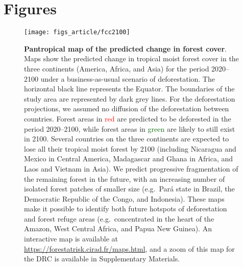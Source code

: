 \documentclass[
  12pt,
]{article}
\begin{document}
\nolinenumbers
\newpage


\hypertarget{figures}{%
\section*{Figures}\label{figures}}



\begin{figure}[H]

{\centering \texttt{[image: figs\_article/fcc2100]} 

}

\caption{\textbf{Pantropical map of the predicted change in forest cover}. Maps show the predicted change in tropical moist forest cover in the three continents (America, Africa, and Asia) for the period 2020--2100 under a business-as-usual scenario of deforestation. The horizontal black line represents the Equator. The boundaries of the study area are represented by dark grey lines. For the deforestation projections, we assumed no diffusion of the deforestation between countries. Forest areas in \textcolor{red}{red} are predicted to be deforested in the period 2020--2100, while forest areas in \textcolor{darkgreen}{green} are likely to still exist in 2100. Several countries on the three continents are expected to lose all their tropical moist forest by 2100 (including Nicaragua and Mexico in Central America, Madagascar and Ghana in Africa, and Laos and Vietnam in Asia). We predict progressive fragmentation of the remaining forest in the future, with an increasing number of isolated forest patches of smaller size (e.g.~Pará state in Brazil, the Democratic Republic of the Congo, and Indonesia). These maps make it possible to identify both future hotspots of deforestation and forest refuge areas (e.g.~concentrated in the heart of the Amazon, West Central Africa, and Papua New Guinea). An interactive map is available at \url{https://forestatrisk.cirad.fr/maps.html}, and a zoom of this map for the DRC is available in Supplementary Materials.}\label{fig:fcc2100}
\end{figure}
\end{document}
